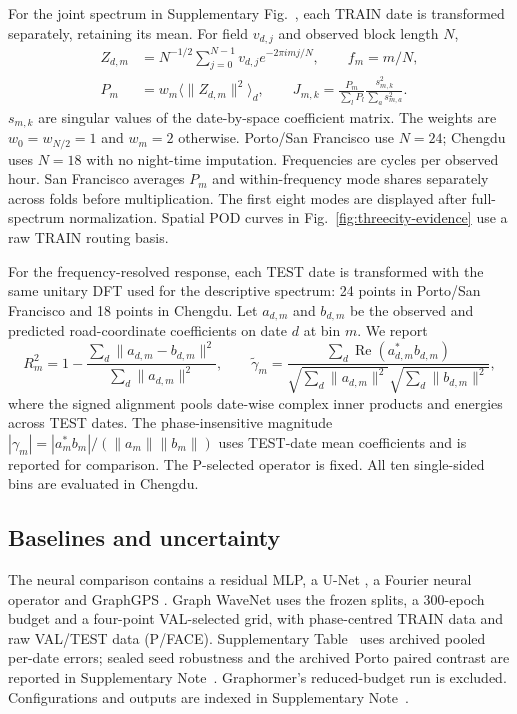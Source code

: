 \documentclass[11pt]{article}
\begin{document}
For the joint spectrum in Supplementary Fig.~, each TRAIN date is transformed separately, retaining its mean. For field $v_{d,j}$ and observed block length $N$,
\begin{equation}\label{eq:m-spectrum}
 \begin{aligned}
 Z_{d,m}&=N^{-1/2}\sum_{j=0}^{N-1}v_{d,j}e^{-2\pi imj/N},\qquad f_m=m/N,\\
 P_m&=w_m\langle\|Z_{d,m}\|^2\rangle_d,\qquad
 J_{m,k}=\frac{P_m}{\sum_lP_l}\frac{s_{m,k}^2}{\sum_a s_{m,a}^2}.
 \end{aligned}
\end{equation}
$s_{m,k}$ are singular values of the date-by-space coefficient matrix. The weights are $w_0=w_{N/2}=1$ and $w_m=2$ otherwise. Porto/San Francisco use $N=24$; Chengdu uses $N=18$ with no night-time imputation. Frequencies are cycles per observed hour. San Francisco averages $P_m$ and within-frequency mode shares separately across folds before multiplication. The first eight modes are displayed after full-spectrum normalization. Spatial POD curves in Fig.~\ref{fig:threecity-evidence} use a raw TRAIN routing basis.

For the frequency-resolved response, each TEST date is transformed with the same unitary DFT used for the descriptive spectrum: 24 points in Porto/San Francisco and 18 points in Chengdu. Let $a_{d,m}$ and $b_{d,m}$ be the observed and predicted road-coordinate coefficients on date $d$ at bin $m$. We report
\begin{equation}\label{eq:m-coherent}
 R_m^2=1-\frac{\sum_d\|a_{d,m}-b_{d,m}\|^2}{\sum_d\|a_{d,m}\|^2},
 \qquad
 \widetilde\gamma_m=\frac{\sum_d\operatorname{Re}(a_{d,m}^*b_{d,m})}
 {\sqrt{\sum_d\|a_{d,m}\|^2}\sqrt{\sum_d\|b_{d,m}\|^2}},
\end{equation}
where the signed alignment pools date-wise complex inner products and energies across TEST dates. The phase-insensitive magnitude $|\gamma_m|=|a_m^*b_m|/(\|a_m\|\|b_m\|)$ uses TEST-date mean coefficients and is reported for comparison. The P-selected operator is fixed. All ten single-sided bins are evaluated in Chengdu.

\subsection{Baselines and uncertainty}

The neural comparison contains a residual MLP, a U-Net \cite{ronneberger2015unet}, a Fourier neural operator \cite{li2021fourier} and GraphGPS \cite{rampasek2022graphgps}. Graph WaveNet uses the frozen splits, a 300-epoch budget and a four-point VAL-selected grid, with phase-centred TRAIN data and raw VAL/TEST data (P/FACE). Supplementary Table~ uses archived pooled per-date errors; sealed seed robustness and the archived Porto paired contrast are reported in Supplementary Note~. Graphormer's reduced-budget run is excluded. Configurations and outputs are indexed in Supplementary Note~.
\end{document}

